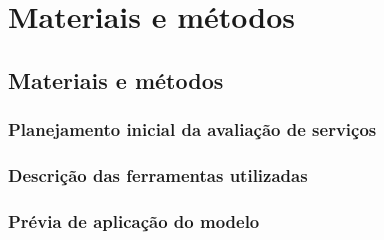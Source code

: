 \chapter[Materiais e métodos]{Materiais e métodos}
\section{Materiais e métodos}
	\subsection{Planejamento inicial da avaliação de serviços}
	\subsection{Descrição das ferramentas utilizadas}
	\subsection{Prévia de aplicação do modelo}

